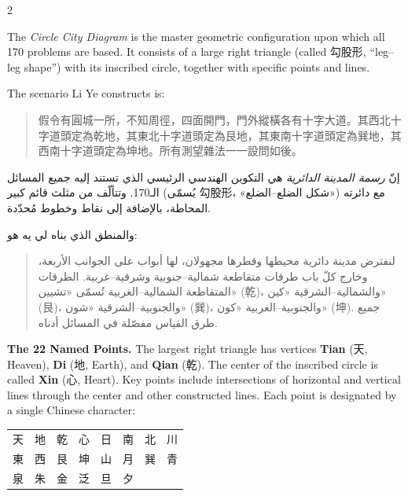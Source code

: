 \documentclass[11pt,a4paper]{article}
\newcommand{\ar}[1]{\arabicfont\beginR #1\endR}
\begin{document}
\begin{paracol}{2}

The \textit{Circle City Diagram} is the master geometric configuration upon which all 170 problems are based. It consists of a large right triangle (called 勾股形, ``leg--leg shape'') with its inscribed circle, together with specific points and lines.

\vspace{0.3cm}

The scenario Li Ye constructs is:

\begin{quote}
假令有圓城一所，不知周徑，四面開門，門外縱橫各有十字大道。其西北十字道頭定為乾地，其東北十字道頭定為艮地，其東南十字道頭定為巽地，其西南十字道頭定為坤地。所有測望雜法一一設問如後。
\end{quote}

\switchcolumn

\ar{إنّ \textit{رسمة المدينة الدائرية} هي التكوين الهندسي الرئيسي الذي تستند إليه جميع المسائل الـ170. وتتألّف من مثلث قائم كبير (يُسمّى 勾股形، «شكل الضلع–الضلع») مع دائرته المحاطة، بالإضافة إلى نقاط وخطوط مُحدّدة.}

\vspace{0.3cm}

\ar{والمنطق الذي بناه لي يه هو:}

\begin{quote}
\ar{لنفترض مدينة دائرية محيطها وقطرها مجهولان، لها أبواب على الجوانب الأربعة، وخارج كلّ باب طرقات متقاطعة شمالية–جنوبية وشرقية–غربية. الطرقات المتقاطعة الشمالية–الغربية تُسمّى «تشيين» (乾)، والشمالية–الشرقية «كين» (艮)، والجنوبية–الشرقية «شون» (巽)، والجنوبية–الغربية «كون» (坤). جميع طرق القياس مفصّلة في المسائل أدناه.}
\end{quote}

\switchcolumn*

\textbf{The 22 Named Points.} The largest right triangle has vertices \textbf{Tian} (天, Heaven), \textbf{Di} (地, Earth), and \textbf{Qian} (乾). The center of the inscribed circle is called \textbf{Xin} (心, Heart). Key points include intersections of horizontal and vertical lines through the center and other constructed lines. Each point is designated by a single Chinese character:

\begin{center}
\begin{tabular}{llllllll}
\toprule
天 & 地 & 乾 & 心 & 日 & 南 & 北 & 川 \\
東 & 西 & 艮 & 坤 & 山 & 月 & 巽 & 青 \\
泉 & 朱 & 金 & 泛 & 旦 & 夕 & & \\
\bottomrule
\end{tabular}
\end{center}


\end{paracol}
\end{document}

